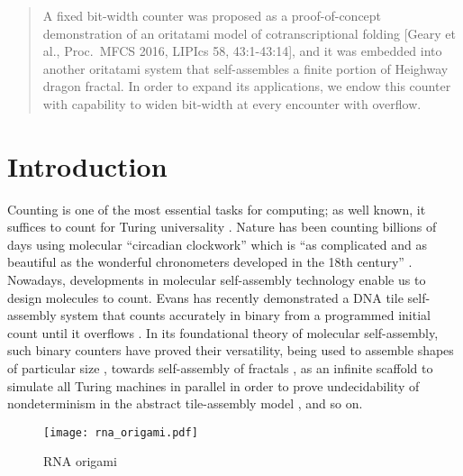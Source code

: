\documentclass{llncs}
\begin{document}
\begin{abstract}
A fixed bit-width counter was proposed as a proof-of-concept demonstration of an oritatami model of cotranscriptional folding [Geary et al., Proc.~MFCS 2016, LIPIcs 58, 43:1-43:14], and it was embedded into another oritatami system that self-assembles a finite portion of Heighway dragon fractal. 
In order to expand its applications, we endow this counter with capability to widen bit-width at every encounter with overflow. 
\end{abstract}

\section{Introduction}

Counting is one of the most essential tasks for computing; as well known, it suffices to count for Turing universality \cite{Minsky1967}. 
Nature has been counting billions of days using molecular ``circadian clockwork'' which is ``as complicated and as beautiful as the wonderful chronometers developed in the 18th century''  \cite{McClung2006}. 
Nowadays, developments in molecular self-assembly technology enable us to design molecules to count. 
Evans has recently demonstrated a DNA tile self-assembly system that counts accurately in binary from a programmed initial count until it overflows \cite{EvansPhD}. 
In its foundational theory of molecular self-assembly, such binary counters have proved their versatility, being used to assemble shapes of particular size \cite{AdChGoHu2001,RothemundWinfree2000}, towards self-assembly of fractals \cite{MasudaSekiUbukata2018}, as an infinite scaffold to simulate all Turing machines in parallel in order to prove undecidability of nondeterminism in the abstract tile-assembly model \cite{BrChDoKaSe2013}, and so on. 

\begin{figure}[tb]
\centering
\texttt{[image: rna\_origami.pdf]}
\caption{RNA origami}
\label{fig:rna_origami}
\end{figure}
\end{document}
